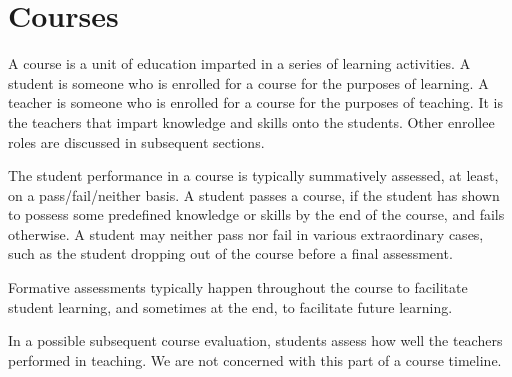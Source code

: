 
\section{Courses}

A course is a unit of education imparted in a series of learning activities. A
student is someone who is enrolled for a course for the purposes of learning.
A teacher is someone who is enrolled for a course for the purposes of teaching.
It is the teachers that impart knowledge and skills onto the students. Other
enrollee roles are discussed in subsequent sections.

The student performance in a course is typically summatively assessed, at
least, on a pass/fail/neither basis. A student passes a course, if the student
has shown to possess some predefined knowledge or skills by the end of the
course, and fails otherwise.  A student may neither pass nor fail in various
extraordinary cases, such as the student dropping out of the course before a
final assessment.

Formative assessments typically happen throughout the course to facilitate
student learning, and sometimes at the end, to facilitate future learning.

In a possible subsequent course evaluation, students assess how well the
teachers performed in teaching. We are not concerned with this part of a course
timeline.
